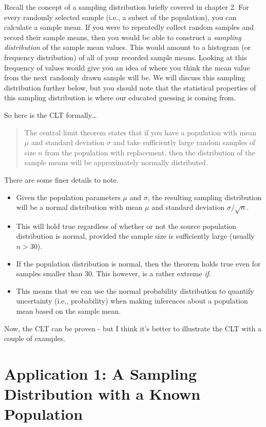\documentclass[
]{book}
\begin{document}
Recall the concept of a sampling distribution briefly covered in chapter 2. For every randomly selected sample (i.e., a subset of the population), you can calculate a sample mean. If you were to repeatedly collect random samples and record their sample means, then you would be able to construct a \emph{sampling distribution} of the sample mean values. This would amount to a histogram (or frequency distribution) of all of your recorded sample means. Looking at this frequency of values would give you an idea of where you think the mean value from the next randomly drawn sample will be. We will discuss this sampling distribution further below, but you should note that the statistical properties of this sampling distribution is where our educated guessing is coming from.

So here is the CLT formally\ldots{}

\begin{quote}
The central limit theorem states that if you have a population with mean \(\mu\) and standard deviation \(\sigma\) and take sufficiently large random samples of size \(n\) from the population with replacement, then the distribution of the sample means will be approximately normally distributed.
\end{quote}

There are some finer details to note.

\begin{itemize}
\item
  Given the population parameters \(\mu\) and \(\sigma\), the resulting sampling distribution will be a normal distribution with mean \(\mu\) and standard deviation \(\sigma / \sqrt{n}\).
\item
  This will hold true regardless of whether or not the source population distribution is normal, provided the sample size is sufficiently large (usually \(n > 30\)).
\item
  If the population distribution is normal, then the theorem holds true even for samples smaller than 30. This however, is a rather extreme \emph{if}.
\item
  This means that we can use the normal probability distribution to quantify uncertainty (i.e., probability) when making inferences about a population mean based on the sample mean.
\end{itemize}

Now, the CLT can be proven - but I think it's better to illustrate the CLT with a couple of examples.

\section{Application 1: A Sampling Distribution with a Known Population}\label{application-1-a-sampling-distribution-with-a-known-population}
\end{document}
